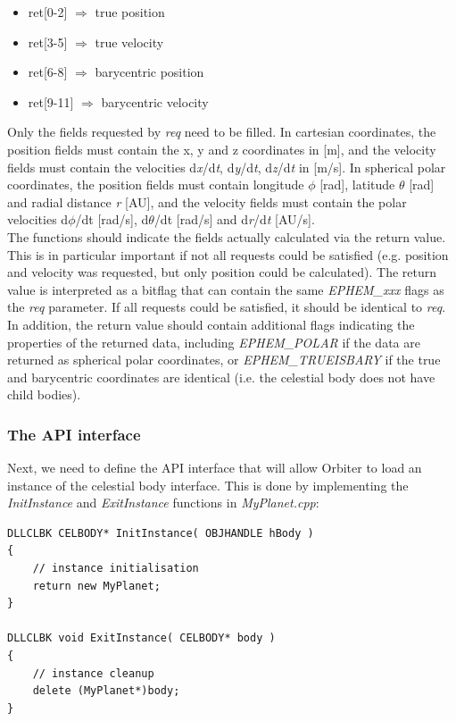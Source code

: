 \documentclass[Orbiter Developer Manual.tex]{subfiles}
\begin{document}
\begin{itemize}
\item ret[0-2] $\Rightarrow$ true position
\item ret[3-5] $\Rightarrow$ true velocity
\item ret[6-8] $\Rightarrow$ barycentric position
\item ret[9-11] $\Rightarrow$ barycentric velocity
\end{itemize}

\noindent
Only the fields requested by \textit{req} need to be filled. In cartesian coordinates, the position fields must contain the x, y and z coordinates in [m], and the velocity fields must contain the velocities d\textit{x}/d\textit{t}, d\textit{y}/d\textit{t}, d\textit{z}/d\textit{t} in [m/s]. In spherical polar coordinates, the position fields must contain longitude $\phi$ [rad], latitude $\theta$ [rad] and radial distance \textit{r} [AU], and the velocity fields must contain the polar velocities d$\phi$/dt [rad/s], d$\theta$/dt [rad/s] and d\textit{r}/d\textit{t} [AU/s].\\
The functions should indicate the fields actually calculated via the return value. This is in particular important if not all requests could be satisfied (e.g. position and velocity was requested, but only position could be calculated). The return value is interpreted as a bitflag that can contain the same \textit{EPHEM\_xxx} flags as the \textit{req} parameter. If all requests could be satisfied, it should be identical to \textit{req}. In addition, the return value should contain additional flags indicating the properties of the returned data, including \textit{EPHEM\_POLAR} if the data are returned as spherical polar coordinates, or \textit{EPHEM\_TRUEISBARY} if the true and barycentric coordinates are identical (i.e. the celestial body does not have child bodies).


\subsubsection{The API interface}
Next, we need to define the API interface that will allow Orbiter to load an instance of the celestial body interface. This is done by implementing the \textit{InitInstance} and \textit{ExitInstance} functions in \textit{MyPlanet.cpp}:

\begin{lstlisting}
DLLCLBK CELBODY* InitInstance( OBJHANDLE hBody )
{
	// instance initialisation
	return new MyPlanet;
}

DLLCLBK void ExitInstance( CELBODY* body )
{
	// instance cleanup
	delete (MyPlanet*)body;
}
\end{lstlisting}
\end{document}
